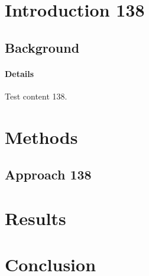 \documentclass{article}
\begin{document}
\section{Introduction 138}
\subsection{Background}
\paragraph{Details} Test content 138.
\section{Methods}
\subsection{Approach 138}
\section{Results}
\section{Conclusion}
\end{document}
